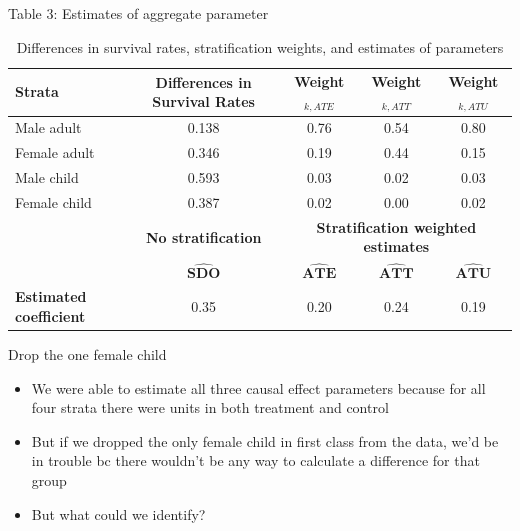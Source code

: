 \documentclass{beamer}
\begin{document}
\begin{frame}{Table 3: Estimates of aggregate parameter}

{\renewcommand{\arraystretch}{1.1}
\tabcolsep 		
\begin{table}\tiny{}
\caption{Differences in survival rates, stratification weights, and estimates of parameters}
\centering
\begin{tabular}{lc|ccc}
\toprule
\multicolumn{1}{l}{\textbf{Strata}}&
\multicolumn{1}{c}{\textbf{Differences in Survival Rates}}&
\multicolumn{1}{c}{\textbf{Weight$_{k,ATE}$}}&
\multicolumn{1}{c}{\textbf{Weight$_{k,ATT}$}}&
\multicolumn{1}{c}{\textbf{Weight$_{k,ATU}$}}\\
\midrule
Male adult		& 0.138 &	0.76 &	0.54	&0.80	\\
Female adult	& 0.346 &	0.19 &	0.44	&0.15	\\
Male child		& 0.593 &	0.03 &	0.02	&0.03	\\
Female child	& 0.387 &	0.02 &	0.00	&0.02	\\
\midrule
\multicolumn{1}{l}{\textbf{}}&
\multicolumn{1}{c}{\textbf{No stratification}}&
\multicolumn{3}{c}{\textbf{Stratification weighted estimates}}\\

 & $\widehat{\textbf{SDO}}$& $\widehat{\textbf{ATE}}$ & $\widehat{\textbf{ATT}}$ & $\widehat{\textbf{ATU}}$ \\
\midrule
\textbf{Estimated coefficient}& 0.35 & 0.20 & 	0.24	 & 0.19   \\
\bottomrule
\end{tabular}
\label{tab:titanic-weights}
\end{table}}

\end{frame}

\begin{frame}{Drop the one female child}

\begin{itemize}
\item We were able to estimate all three causal effect parameters because for all four strata there were units in both treatment and control
\item But if we dropped the only female child in first class from the data, we'd be in trouble bc there wouldn't be any way to calculate a difference for that group
\item But what could we identify?

\end{itemize}

\end{frame}
\end{document}

